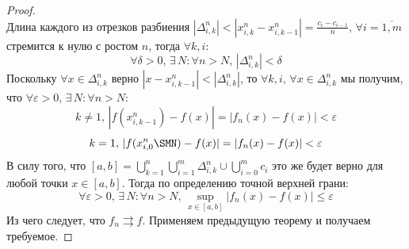 \documentclass[12pt]{article}
\newcommand{\VE}{\varepsilon}
\theoremstyle{definition}
\begin{document}
\begin{proof}
$$	$$
	Длина каждого из отрезков разбиения $|\Delta_{i,k}^n| < |x_{i,k}^n - x_{i,k-1}^n| = \tfrac{c_i - c_{i-1}}{n}, \, \forall i = \overline{1,m}$ стремится к нулю с ростом $n$, тогда $\forall k,i$:
	$$
		\forall \delta > 0, \, \exists \, N \colon \forall n > N, \, |\Delta_{i,k}^n| < \delta
	$$
	Поскольку $\forall x \in \Delta_{i,k}^n$ верно $|x - x_{i,k-1}^n| < |\Delta_{i,k}^n|$, то $\forall k,i, \, \forall x \in \Delta_{i,k}^n$ мы получим, что $\forall \VE > 0, \, \exists \, N \colon \forall n > N$:
	$$
		k \neq 1,  \, |f(x_{i,k-1}^n) - f(x)|  = |f_n(x) - f(x)| < \VE
	$$
	$$
		k = 1,\, |f(x_{i,0}^n\SMN) - f(x)|  = |f_n(x) - f(x)| < \VE
	$$
	В силу того, что $[a,b] = \bigcup\limits_{k=1}^n\bigcup\limits_{i=1}^m\Delta_{i,k}^n \cup \bigcup\limits_{i=0}^m c_i$ это же будет верно для любой точки $x \in [a,b]$. Тогда по определению точной верхней грани:
	$$
		\forall \VE > 0, \, \exists \, N \colon \forall n > N, \, \sup\limits_{x \in [a,b]}|f_n(x) - f(x)| \leq \VE 
	$$
	Из чего следует, что $f_n \rightrightarrows f$. Применяем предыдущую теорему и получаем требуемое.
\end{proof}
\end{document}
